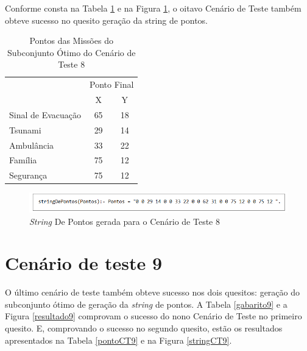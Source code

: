 	Conforme consta na Tabela \ref{pontoCT8} e na Figura \ref{stringCT8}, o oitavo Cenário de Teste também obteve sucesso no quesito geração da string de pontos.

\begin{table}[!h]
\centering
\caption{Pontos das Missões do Subconjunto Ótimo do Cenário de Teste 8}
\label{pontoCT8}
\begin{tabular}{lcc}
\rowcolor[HTML]{00D2CB} 
\multicolumn{1}{c}{\cellcolor[HTML]{00D2CB}} & \multicolumn{2}{l}{\cellcolor[HTML]{00D2CB}Ponto Final} \\ 
\rowcolor[HTML]{C0F2F0} 
\multicolumn{1}{c}{\cellcolor[HTML]{00D2CB}Missão} & \multicolumn{1}{c}{\cellcolor[HTML]{C0F2F0}X} & \multicolumn{1}{c}{\cellcolor[HTML]{C0F2F0}Y} \\
 Sinal de Evacuação & 65 & 18 \\
 Tsunami & 29 & 14 \\
 Ambulância & 33 & 22 \\
 Família & 75 & 12 \\
 Segurança & 75 & 12    \\          
\end{tabular}
\end{table}


\FloatBarrier
\begin{figure}[!h]
\centering
\includegraphics[keepaspectratio=true,scale=0.7]{figuras/stringCT8.png}
\caption{\textit{String} De Pontos gerada para o Cenário de Teste 8}
\label{stringCT8}
\end{figure}



\section{Cenário de teste 9}

	O último cenário de teste também obteve sucesso nos dois quesitos: geração do subconjunto ótimo de geração da \textit{string }de pontos. A Tabela \ref{gabarito9} e a Figura \ref{resultado9} comprovam o sucesso do nono Cenário de Teste no primeiro quesito. E, comprovando o sucesso no segundo quesito, estão os resultados apresentados na Tabela \ref{pontoCT9} e na Figura \ref{stringCT9}.

